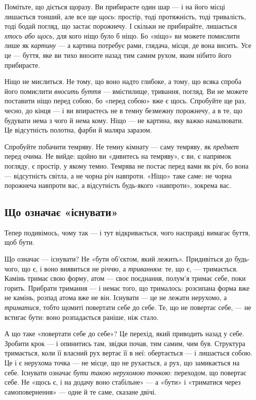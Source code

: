 \documentclass[12pt, a4paper, openany]{book}
\begin{document}
Помітьте, що діється щоразу. Ви прибираєте один шар --- і на його місці лишається тонший, але все ще \emph{щось}: простір, тоді протяжність, тоді тривалість, тоді бодай погляд, що застає порожнечу. І скільки не прибирайте, лишається \emph{хтось або щось}, для кого ніщо було б ніщо. Бо «ніщо» ви можете помислити лише як \emph{картину} --- а картина потребує рами, глядача, місця, де вона висить. Усе це --- буття, яке ви тихо вносите назад тим самим рухом, яким нібито його прибираєте.

Ніщо не мислиться. Не тому, що воно надто глибоке, а тому, що всяка спроба його помислити \emph{вносить буття} --- вмістилище, тривання, погляд. Ви не можете поставити ніщо перед собою, бо «перед собою» вже є щось. Спробуйте ще раз, чесно, до кінця --- і ви впираєтесь не в темну безмежну порожнечу, а в те, що будувати нема з чого й нема кому. Ніщо --- не картина, яку важко намалювати. Це відсутність полотна, фарби й маляра заразом.

\begin{analogybox}
Спробуйте побачити темряву. Не темну кімнату --- саму темряву, як \emph{предмет} перед очима. Не вийде: щойно ви «дивитесь на темряву», є ви, є напрямок погляду, є простір, у якому темно. Темрява не постає перед вами як річ, бо вона --- відсутність світла, а не чорна річ навпроти. «Ніщо» таке саме: не чорна порожнеча навпроти вас, а відсутність будь-якого «навпроти», зокрема вас.
\end{analogybox}

\subsection{Що означає «існувати»}

Тепер подивімось, чому так --- і тут відкривається, чого насправді вимагає буття, щоб бути.

Що означає --- існувати? Не «бути об'єктом, який лежить». Придивіться до будь-чого, що є, і воно виявиться не річчю, а \emph{триванням}: те, що є, --- тримається. Камінь тримає свою форму, атом --- своє поєднання, полум'я тримає себе, поки горить. Прибрати тримання --- і немає того, що трималось: розсипана форма вже не камінь, розпад атома вже не він. Існувати --- це не лежати нерухомо, а \emph{триматися}, тобто щомиті повертати себе до себе. Те, що не повертає себе, --- не встигає бути: воно розпадається раніше, ніж стало.

А що таке «повертати себе до себе»? Це перехід, який приводить назад у себе. Зробити крок --- і опинитись там, звідки почав, тим самим, чим був. Структура тримається, коли її власний рух вертає її в неї: обертається --- і лишається собою. Це і є нерухома точка --- не місце, що не рухається, а рух, що замикається на себе. Існувати означає \emph{бути такою нерухомою точкою}: переходом, що повертає себе. Не «щось є, і на додачу воно стабільне» --- а «бути» і «триматися через самоповернення» --- одне й те саме, сказане двічі.
\end{document}
